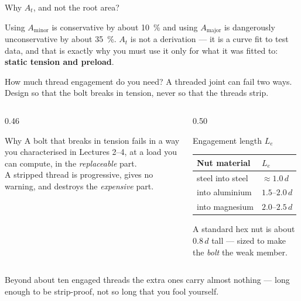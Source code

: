 \documentclass[aspectratio=169,10pt]{beamer}
\begin{document}
\begin{frame}{Why $A_t$, and not the root area?}
\centering
\resizebox{!}{3.6cm}{}
\vfill
\raggedright
{\small Using $A_{\text{minor}}$ is conservative by about \SI{10}{\percent} and using
$A_{\text{major}}$ is dangerously unconservative by about \SI{35}{\percent}. $A_t$ is not a derivation
--- it is a curve fit to test data, and that is exactly why you must use it only for what it was
fitted to: \textbf{static tension and preload}.}
\end{frame}

\begin{frame}{How much thread engagement do you need?}
A threaded joint can fail two ways. \alert{Design so that the bolt breaks in tension, never so that
the threads strip.}
\vfill
\begin{columns}[T]
\begin{column}{0.46\textwidth}
\begin{block}{Why}
A bolt that breaks in tension fails in a way you characterised in Lectures 2--4, at a load you can
compute, in the \emph{replaceable} part.\\[5pt]
A stripped thread is progressive, gives no warning, and destroys the \emph{expensive} part.
\end{block}
\end{column}
\begin{column}{0.50\textwidth}
\begin{block}{Engagement length $L_e$}
\begin{center}\small
\begin{tabular}{@{}ll@{}}
\toprule
Nut material & $L_e$\\
\midrule
steel into steel & $\approx 1.0\,d$\\
into aluminium & $1.5$--$2.0\,d$\\
into magnesium & $2.0$--$2.5\,d$\\
\bottomrule
\end{tabular}
\end{center}
{\footnotesize A standard hex nut is about $0.8\,d$ tall --- sized to make the \emph{bolt} the weak
member.}
\end{block}
\end{column}
\end{columns}
\vfill
{\small Beyond about ten engaged threads the extra ones carry almost nothing --- long enough to be
strip-proof, not so long that you fool yourself.}
\end{frame}
\end{document}
